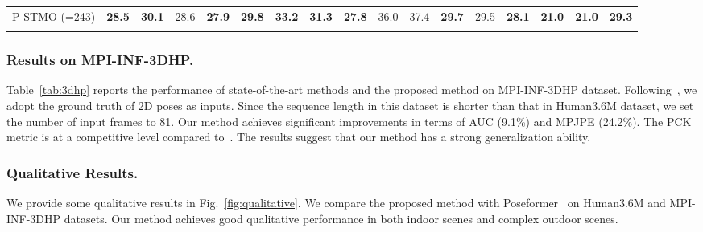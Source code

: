\documentclass[]{llncs}
\begin{document}
\begin{table}[t]
\begin{center}
{\begin{tabular}{c|ccccccccccccccc|c}
\noalign{\smallskip}
\hline
\noalign{\smallskip}
P-STMO (=243)  &
\textbf{28.5}&\textbf{30.1}&\underline{28.6}&\textbf{27.9}&\textbf{29.8}&\textbf{33.2}&\textbf{31.3}&\textbf{27.8}&\underline{36.0}&\underline{37.4}&\textbf{29.7}&\underline{29.5}&\textbf{28.1}&\textbf{21.0}&\textbf{21.0}&\textbf{29.3}\\
\noalign{\smallskip}
\hline
\end{tabular}}
\end{center}
\vspace{-0.8cm}
\end{table}


\subsubsection{Results on MPI-INF-3DHP.}
Table~\ref{tab:3dhp} reports the performance of state-of-the-art methods and the proposed method on MPI-INF-3DHP dataset. Following~\cite{hu2021conditional,wang2020motion,zheng20213d}, we adopt the ground truth of 2D poses as inputs. Since the sequence length in this dataset is shorter than that in Human3.6M dataset, we set the number of input frames to 81. Our method achieves significant improvements in terms of AUC (9.1\%) and MPJPE (24.2\%). The PCK metric is at a competitive level compared to~\cite{hu2021conditional}. The results suggest that our method has a strong generalization ability.

\subsubsection{Qualitative Results.}
We provide some qualitative results in Fig.~\ref{fig:qualitative}. We compare the proposed method with Poseformer~\cite{zheng20213d} on Human3.6M and MPI-INF-3DHP datasets. Our method achieves good qualitative performance in both indoor scenes and complex outdoor scenes.
\end{document}
